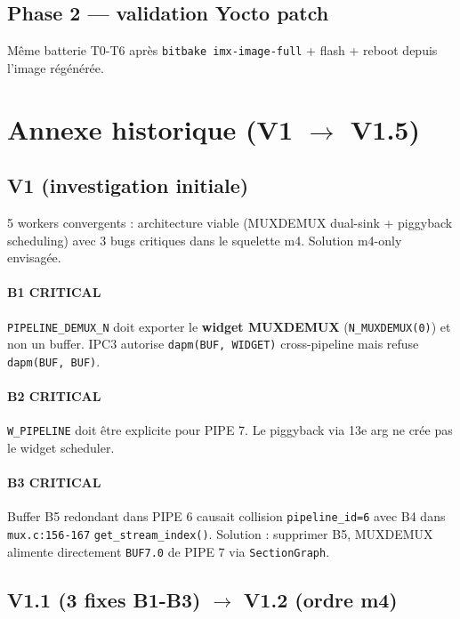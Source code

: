 \documentclass[11pt,a4paper]{article}
\begin{document}
\subsection{Phase 2 — validation Yocto patch}

Même batterie T0-T6 après \texttt{bitbake imx-image-full} + flash + reboot depuis l'image régénérée.

\section{Annexe historique (V1 $\to$ V1.5)}

\subsection{V1 (investigation initiale)}

5 workers convergents : architecture viable (MUXDEMUX dual-sink + piggyback scheduling) avec 3 bugs critiques dans le squelette m4. Solution m4-only envisagée.

\paragraph{B1 CRITICAL} \texttt{PIPELINE\_DEMUX\_N} doit exporter le \textbf{widget MUXDEMUX} (\texttt{N\_MUXDEMUX(0)}) et non un buffer. IPC3 autorise \texttt{dapm(BUF, WIDGET)} cross-pipeline mais refuse \texttt{dapm(BUF, BUF)}.

\paragraph{B2 CRITICAL} \texttt{W\_PIPELINE} doit être explicite pour PIPE 7. Le piggyback via 13e arg ne crée pas le widget scheduler.

\paragraph{B3 CRITICAL} Buffer B5 redondant dans PIPE 6 causait collision \texttt{pipeline\_id=6} avec B4 dans \texttt{mux.c:156-167} \texttt{get\_stream\_index()}. Solution : supprimer B5, MUXDEMUX alimente directement \texttt{BUF7.0} de PIPE 7 via \texttt{SectionGraph}.

\subsection{V1.1 (3 fixes B1-B3) $\to$ V1.2 (ordre m4)}
\end{document}

